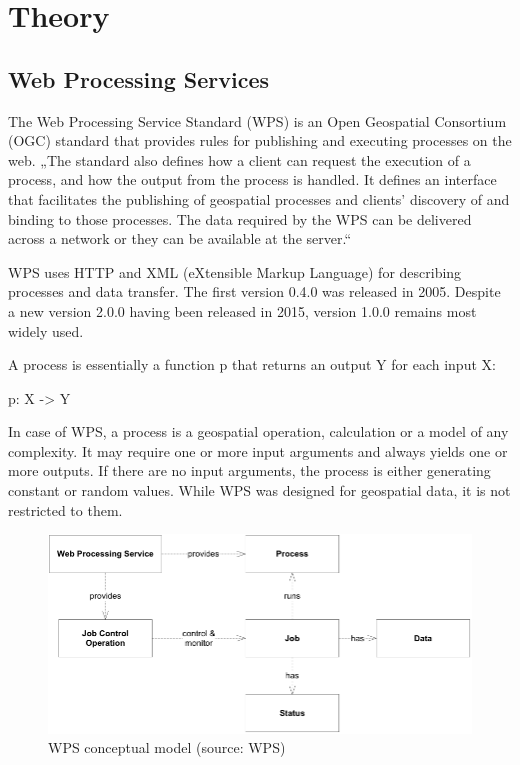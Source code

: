 \chapter{Theory}
\label{2-teorie}

\section{Web Processing Services}

The Web Processing Service Standard (WPS) is an Open Geospatial Consortium (OGC) standard that provides rules for publishing and executing processes on the web. „The standard also defines how a client can request the execution of a process, and how the output from the process is handled. It defines an interface that facilitates the publishing of geospatial processes and clients’ discovery of and binding to those processes. The data required by the WPS can be delivered across a network or they can be available at the server.“ \cite{wpsstandard}

WPS uses HTTP and XML (eXtensible Markup Language) for describing processes and data transfer. The first version 0.4.0 was released in 2005. Despite a new version 2.0.0 having been released in 2015, version 1.0.0 remains most widely used.

A process is essentially a function p that returns an output Y for each input X:\\
\centerline{p: X -> Y}

In case of WPS, a process is a geospatial operation, calculation or a model of any complexity. It may require one or more input arguments and always yields one or more outputs. If there are no input arguments, the process is either generating constant or random values. While WPS was designed for geospatial data, it is not restricted to them.

\begin{figure}[H] \centering
      \includegraphics[width=400pt]{./pictures/wps_conceptual_model.png}
      \caption[QGIS logo]{WPS conceptual model (source: WPS)}
      \label{fig:WPS}
  \end{figure}


